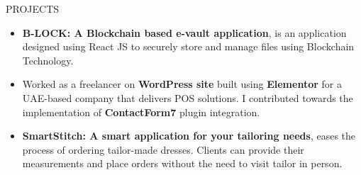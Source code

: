 \documentclass{resume} %
\begin{document}
\begin{rSection}{PROJECTS}
    \begin{itemize}

        \item \textbf{B-LOCK: A Blockchain based e-vault application}{, is
                  an application designed using React JS to securely store and manage
                  files using Blockchain Technology.
              }

              \item Worked as a freelancer on \textbf{WordPress site} built using \textbf{Elementor} for a UAE-based company that delivers POS solutions. I contributed towards the implementation of \textbf{ContactForm7} plugin integration.

        \item \textbf{SmartStitch: A smart application for your tailoring needs}{, eases the process of ordering tailor-made dresses. Clients can provide their measurements and place orders without the need to visit tailor in person.
              }




    \end{itemize}

\end{rSection}
\end{document}

